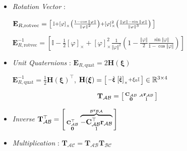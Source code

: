 \documentclass[landscape,a0paper,fontscale=0.285]{baposter} %
\newcommand{\compresslist}{ %
\setlength{\itemsep}{1pt}
\setlength{\parskip}{0pt}
\setlength{\parsep}{0pt}
}
\renewenvironment{bmatrix}{\left[\begin{smallmatrix}}{\end{smallmatrix}\right]}
\begin{document}
\begin{poster}
{\begin{itemize}
    $\mathbf{E}_{R,\text{angleaxis}}^{-1}=\begin{bmatrix}\mathbf{n}^\top \\ -\frac{1}{2}\frac{\sin\theta}{1-\cos\theta}\left[\mathbf{n}\right]^2_{\times}-\frac{1}{2}\left[\boldsymbol{n}\right]_{\times}\end{bmatrix}$
    \item \textit{Rotation Vector} : 
    
    \hspace{-12pt}$\mathbf{E}_{R,\text{rotvec}}=\begin{bmatrix}\mathbb{I}+\left[\varphi\right]_{\times}\left(\frac{1-\cos\Vert\varphi\Vert}{\Vert\varphi\Vert^2}\right)+\left[\varphi\right]_{\times}^2\left(\frac{\Vert \varphi \Vert -\sin\Vert \varphi\Vert}{\Vert \varphi\Vert^3}\right)\end{bmatrix}$ 
    
    \hspace{-12pt}$\mathbf{E}_{R,\text{rotvec}}^{-1}\!\!=\!\left[\mathbb{I} \!-\!\frac{1}{2}\left[\varphi\right]_{\times}\!+\!\left[\varphi\right]^2_{\times}\frac{1}{\Vert\varphi\Vert^2}\left(1-\frac{\Vert\varphi\Vert}{2}\frac{\sin\Vert\varphi\Vert}{1-\cos\Vert\varphi\Vert}\right)\right]$
    \item \textit{Unit Quaternions} : $\mathbf{E}_{R,\text{quat}}=2\mathbf{H}(\boldsymbol{\xi})$  
    
    $\mathbf{E}_{R,\text{quat}}^{-1}=\frac{1}{2}\mathbf{H}(\boldsymbol{\xi})^\top$, $\mathbf{H}(\boldsymbol{\xi}) = \begin{bmatrix}-\check{\boldsymbol{\xi}} & \left[\check{\boldsymbol{\xi}}\right]_{\times} + \xi_0 \mathbb{I}\end{bmatrix}\in \mathbb{R}^{3\times 4}$
    \end{itemize}


\colorbox[HTML]{CCFFFF}{}
$$\mathbf{T}_{\mathcal{AB}} = \begin{bmatrix}\mathbf{C}_{\mathcal{AB}} & _{\mathcal{A}}\mathbf{r}_{\mathcal{AB}} \\ \mathbf{0} & 1\end{bmatrix}$$

\begin{itemize}\compresslist
    \item \textit{Inverse} $\mathbf{T}_{\mathcal{AB}}^\top = \begin{bmatrix}\mathbf{C}^\top_{\mathcal{AB}} & \overbrace{-\mathbf{C}_{\mathcal{AB}}^\top \mathbf{r}_{\mathcal{AB}}}^{_{\mathcal{B}}\mathbf{r}_{\mathcal{BA}}} \\ \mathbf{0} & 1\end{bmatrix}$
    \item \textit{Multiplication} : $\mathbf{T}_{\mathcal{AC}}=\mathbf{T}_{\mathcal{AB}} \mathbf{T}_{\mathcal{BC}}$
\end{itemize}

}
\end{poster}
\end{document}
